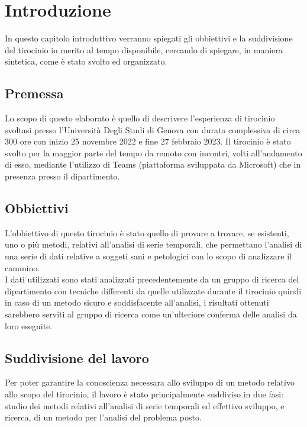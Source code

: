 \section{Introduzione}
In questo capitolo introduttivo verranno spiegati gli obbiettivi e la suddivisione del tirocinio
in merito al tempo disponibile, cercando di spiegare, in maniera sintetica, come è stato
svolto ed organizzato.

\subsection{Premessa}
Lo scopo di questo elaborato è quello di descrivere l'esperienza di tirocinio svoltasi presso
l'Università Degli Studi di Genova con durata complessiva di circa 300 ore con inizio 25 novembre 2022
e fine 27 febbraio 2023. Il tirocinio è stato svolto per la maggior parte del tempo da remoto
con incontri, volti all'andamento di esso, mediante l'utilizzo di Teams (piattaforma sviluppata da Microsoft)
che in presenza presso il dipartimento. 

\subsection{Obbiettivi}
L'obbiettivo di questo tirocinio è stato quello di provare a trovare, se esistenti, uno o più metodi, 
relativi all'analisi di serie temporali, che permettano l'analisi di una serie di 
dati relative a soggeti sani e petologici con lo scopo di analizzare il cammino.
\\
I dati utilizzati sono stati analizzati precedentemente da un gruppo di ricerca del dipartimento
con tecniche differenti da quelle utilizzate durante il tirocinio
quindi in caso di un metodo sicuro e soddisfacente all'analisi, i risultati ottenuti sarebbero
serviti al gruppo di ricerca come un'ulteriore conferma delle analisi da loro eseguite.

\subsection{Suddivisione del lavoro}
Per poter garantire la conoscienza necessara allo sviluppo di un metodo relativo allo scopo
del tirocinio, il lavoro è stato principalmente suddiviso in due fasi: studio dei metodi
relativi all'analisi di serie temporali ed effettivo sviluppo, e ricerca, di un metodo per l'analisi
del problema posto.